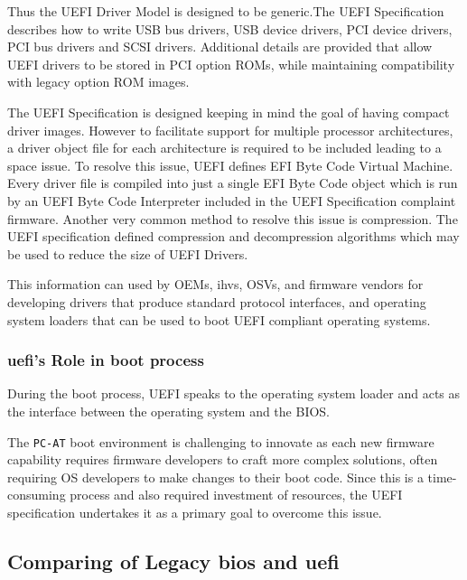 Thus the UEFI Driver Model is designed to be generic.The UEFI Specification describes how to write USB bus drivers, USB device drivers, PCI device drivers, PCI bus drivers and SCSI drivers.
Additional details are provided that allow UEFI drivers to be stored in PCI option ROMs, while maintaining compatibility with legacy option ROM images.

The UEFI Specification is designed keeping in mind the goal of having compact driver images. However to facilitate support for multiple processor architectures, a driver object file for each architecture is required to be included leading to a space issue. To resolve this issue, UEFI defines EFI Byte Code Virtual Machine. Every driver file is compiled into just a single EFI Byte Code object which is run by an UEFI Byte Code Interpreter included in the UEFI Specification complaint firmware. Another very common method to resolve this issue is compression. The UEFI specification defined compression and decompression algorithms which may be used to reduce the size of UEFI Drivers.

This information can used by OEMs, \gls{ihv}s, OSVs, and firmware vendors for developing drivers that produce standard protocol interfaces, and operating system loaders that can be used to boot UEFI compliant operating systems.

\subsubsection{\gls{uefi}'s Role in boot process}

During the boot process, UEFI speaks to the operating system loader and acts as the interface between the operating system and the BIOS.

The \verb|PC-AT| boot environment is challenging to innovate as each new firmware capability requires firmware developers to craft more complex solutions, often requiring OS developers to make changes to their boot code. Since this is a time-consuming process and also required investment of resources, the UEFI specification undertakes it as a primary goal to overcome this issue.

\subsection{Comparing of Legacy \gls{bios} and \gls{uefi}}

